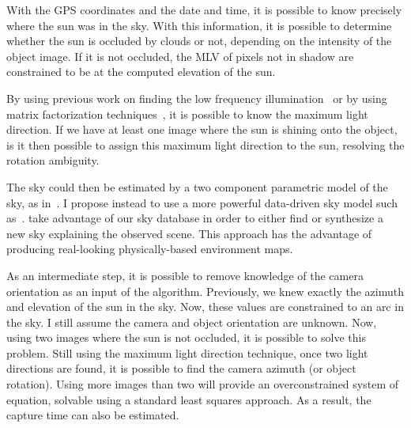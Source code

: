 With the GPS coordinates and the date and time, it is possible to know precisely where the sun was in the sky. With this information, it is possible to determine whether the sun is occluded by clouds or not, depending on the intensity of the object image. If it is not occluded, the MLV of pixels not in shadow are constrained to be at the computed elevation of the sun.

By using previous work on finding the low frequency illumination~\cite{basri-ijcv-2007} or by using matrix factorization techniques~\cite{shi-cvpr-10}, it is possible to know the maximum light direction. If we have at least one image where the sun is shining onto the object, is it then possible to assign this maximum light direction to the sun, resolving the rotation ambiguity.

The sky could then be estimated by a two component parametric model of the sky, as in~\cite{jung-cvpr-15}. I propose instead to use a more powerful data-driven sky model such as~\cite{lalonde-3dv-14}. take advantage of our sky database in order to either find or synthesize a new sky explaining the observed scene. This approach has the advantage of producing real-looking physically-based environment maps.


As an intermediate step, it is possible to remove knowledge of the camera orientation as an input of the algorithm. Previously, we knew exactly the azimuth and elevation of the sun in the sky. Now, these values are constrained to an arc in the sky. I still assume the camera and object orientation are unknown. Now, using two images where the sun is not occluded, it is possible to solve this problem. Still using the maximum light direction technique, once two light directions are found, it is possible to find the camera azimuth (or object rotation). Using more images than two will provide an overconstrained system of equation, solvable using a standard least squares approach. As a result, the capture time can also be estimated.


